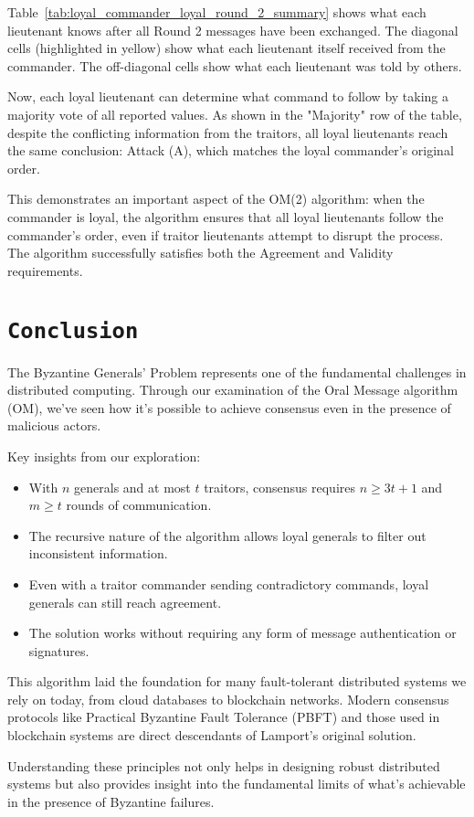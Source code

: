 \documentclass[11pt]{article}
\begin{document}
Table~\ref{tab:loyal_commander_loyal_round_2_summary} shows what each lieutenant knows after all Round 2 messages have been exchanged. The diagonal cells (highlighted in yellow) show what each lieutenant itself received from the commander. The off-diagonal cells show what each lieutenant was told by others.

Now, each loyal lieutenant can determine what command to follow by taking a majority vote of all reported values. As shown in the "Majority" row of the table, despite the conflicting information from the traitors, all loyal lieutenants reach the same conclusion: Attack (A), which matches the loyal commander's original order.

This demonstrates an important aspect of the OM(2) algorithm: when the commander is loyal, the algorithm ensures that all loyal lieutenants follow the commander's order, even if traitor lieutenants attempt to disrupt the process. The algorithm successfully satisfies both the Agreement and Validity requirements.

\section*{\texttt{\Large Conclusion}}

\justifying
The Byzantine Generals' Problem represents one of the fundamental challenges in distributed computing. Through our examination of the Oral Message algorithm (OM), we've seen how it's possible to achieve consensus even in the presence of malicious actors.

Key insights from our exploration:

\begin{itemize}
    \item With $n$ generals and at most $t$ traitors, consensus requires $n \geq 3t+1$ and $m \geq t$ rounds of communication.
    \item The recursive nature of the algorithm allows loyal generals to filter out inconsistent information.
    \item Even with a traitor commander sending contradictory commands, loyal generals can still reach agreement.
    \item The solution works without requiring any form of message authentication or signatures.
\end{itemize}

This algorithm laid the foundation for many fault-tolerant distributed systems we rely on today, from cloud databases to blockchain networks. Modern consensus protocols like Practical Byzantine Fault Tolerance (PBFT) and those used in blockchain systems are direct descendants of Lamport's original solution.

Understanding these principles not only helps in designing robust distributed systems but also provides insight into the fundamental limits of what's achievable in the presence of Byzantine failures.
\end{document}

